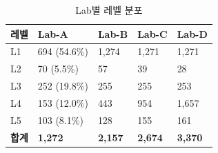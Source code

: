 \begin{table}[!t]
  \caption{Lab별 레벨 분포}
  \label{tab:level-distribution}
  \centering
  \small
  \begin{tabular}{|C{1.1cm}|C{2.3cm}|C{1.6cm}|C{1.6cm}|C{1.6cm}|}
    \hline
    \textbf{레벨} & \textbf{Lab-A} & \textbf{Lab-B} & \textbf{Lab-C} & \textbf{Lab-D} \\
    \hline
    L1          & 694 (54.6\%)   & 1,274          & 1,271          & 1,271          \\
    \hline
    L2          & 70 (5.5\%)     & 57             & 39             & 28             \\
    \hline
    L3          & 252 (19.8\%)   & 255            & 255            & 253            \\
    \hline
    L4          & 153 (12.0\%)   & 443            & 954            & 1,657          \\
    \hline
    L5          & 103 (8.1\%)    & 128            & 155            & 161            \\
    \hline
    \textbf{합계} & \textbf{1,272} & \textbf{2,157} & \textbf{2,674} & \textbf{3,370} \\
    \hline
  \end{tabular}
\end{table}

